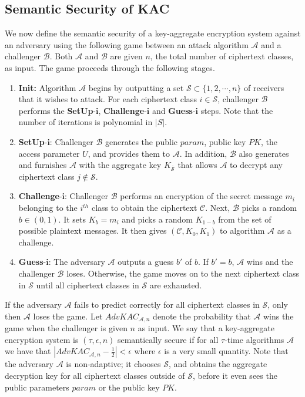 \subsection{Semantic Security of KAC}
\label{subsec:semanticsecurity}

We now define the semantic security of a key-aggregate encryption system against an adversary using the following game between an attack algorithm $\mathcal{A}$ and a challenger $\mathcal{B}$. Both $\mathcal{A}$ and $\mathcal{B}$ are given $n$, the total number of ciphertext classes, as input. The game proceeds through the following stages.

\begin{enumerate}
 \item \textbf{Init:} Algorithm $\mathcal{A}$ begins by outputting a set $\mathcal{S} \subset \{1,2,\cdots,n\}$ of receivers that it wishes to attack. For each ciphertext class $i\in\mathcal{S}$, challenger $\mathcal{B}$ performs the \textbf{SetUp}-$\mathbf{i}$, \textbf{Challenge}-$\mathbf{i}$ and \textbf{Guess}-$\mathbf{i}$ steps. Note that the number of iterations is polynomial in $|S|$.

 \item \textbf{SetUp}-$\mathbf{i}$: Challenger $\mathcal{B}$ generates the public $param$, public key $PK$, the access parameter $U$, and provides them to $\mathcal{A}$. In addition, $\mathcal{B}$ also generates and furnishes $\mathcal{A}$ with the aggregate key $K_{\overline{\mathcal{S}}}$ that allows $\mathcal{A}$ to decrypt any ciphertext class $j\notin\mathcal{S}$. 
 \item \textbf{Challenge}-$\mathbf{i}$: Challenger $\mathcal{B}$ performs an encryption of the secret message $m_i$ belonging to the $i^{th}$ class to obtain the ciphertext $\mathcal{C}$. Next, $\mathcal{B}$ picks a random $b\in{(0,1)}$. It sets $K_b = m_i$ and picks a random $K_{1- b}$ from the set of possible plaintext messages. It then gives $(\mathcal{C}, K_0, K_1)$ to algorithm $\mathcal{A}$ as a challenge.
 
 \item\textbf{Guess}-$\mathbf{i}$: The adversary $\mathcal{A}$ outputs a guess $b'$ of $b$. If $b' = b$, $\mathcal{A}$ wins and the challenger $\mathcal{B}$ loses. Otherwise, the game moves on to the next ciphertext class in $\mathcal{S}$ until all ciphertext classes in $\mathcal{S}$ are exhausted.
\end{enumerate}
If the adversary $\mathcal{A}$ fails to predict correctly for all ciphertext classes in $\mathcal{S}$, only then $\mathcal{A}$ loses the game. Let $AdvKAC_{\mathcal{A},n}$ denote the probability that $\mathcal{A}$ wins the game when the challenger is given $n$ as input. We say that a key-aggregate encryption system is $(\tau,\epsilon,n)$ semantically secure if for all $\tau$-time algorithms $\mathcal{A}$ we have that $|AdvKAC_{\mathcal{A},n}-\frac{1}{2}| < \epsilon$ where $\epsilon$ is a very small quantity. Note that the adversary $\mathcal{A}$ is non-adaptive; it chooses $\mathcal{S}$, and obtains the aggregate decryption key for all ciphertext classes outside of $\mathcal{S}$, before it even sees the public parameters $param$ or the public key $PK$. 


